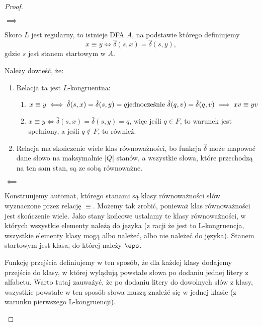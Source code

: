 \begin{proof} \( \)
    \begin{description}
        \item \( \implies \)
        
        Skoro \( L \) jest regularny, to istnieje DFA \( A \), na podstawie którego definiujemy
        \[
            x \equiv y \iff \hat \delta(s, x) = \hat \delta(s, y),
        \]
        gdzie \(s\) jest stanem startowym w \(A\).
        
        Należy dowieść, że:
        \begin{enumerate}
            \item Relacja ta jest \(L\)-kongruentna:
            \begin{enumerate}
                \item \(x \equiv y \iff \hat \delta(s, x) = \hat \delta(s, y) = q \text{\linebreak jednocześnie } \hat \delta(q, v) = \hat \delta(q, v) \implies xv \equiv yv\)
                \item \(x \equiv y \iff \hat \delta(s, x) = \hat \delta(s, y) = q \), więc jeśli \(q \in F\), to warunek jest spełniony, a jeśli \(q \not \in F\), to również. 
            \end{enumerate}
            \item Relacja ma skończenie wiele klas równoważności, bo funkcja \( \hat \delta \) może mapować dane słowo na maksymalnie \( |Q| \) stanów, a wszystkie słowa, które przechodzą na ten sam stan, są ze sobą równoważne. 
        \end{enumerate}
        
        \item \( \impliedby \)
        
        Konstruujemy automat, którego stanami są klasy równoważności słów wyznaczone przez relację \( \equiv \). Możemy tak zrobić, ponieważ klas równoważności jest skończenie wiele.
        Jako stany końcowe ustalamy te klasy równoważności, w których wszystkie elementy należą do języka (z racji że jest to L-kongruencja, wszystkie elementy klasy mogą albo należeć, albo nie należeć do języka).
        Stanem startowym jest klasa, do której należy \( \eps \). 
        
        Funkcję przejścia definiujemy w ten sposób, że dla każdej klasy dodajemy przejście do klasy, w której wylądują powstałe słowa po dodaniu jednej litery z alfabetu.
        Warto tutaj zauważyć, że po dodaniu litery do dowolnych słów z klasy, wszystkie powstałe w ten sposób słowa muszą znaleźć się w jednej klasie (z warunku pierwszego L-kongruencji). 
        

\end{description}
\end{proof}
